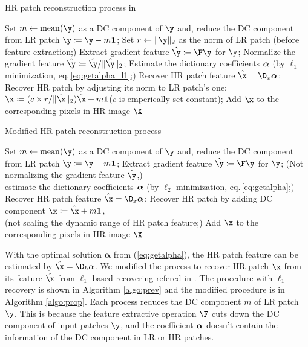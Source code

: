\documentclass[10pt,english]{ikelab-sips}
\begin{document}
 \begin{algorithm}[t]
  \caption{HR patch reconstruction process in \cite{Yang2012}} \label{algo:prev}
  \begin{algorithmic}[1]
   \STATE Set $m\leftarrow\mathrm{mean}(\y)$ as a DC component of $\y$ and,
   \STATE reduce the DC component from LR patch $\y\coloneqq\y-m\bm{1}$;
   \STATE Set $r\leftarrow\|\y\|_2$ as the norm of LR patch (before feature extraction;)
   \STATE Extract gradient feature $\hat\y\coloneqq\F\y$ for $\y$;
   \STATE Normalize the gradient feature $\hat\y\coloneqq\hat\y/\|\hat\y\|_2$;
   \STATE Estimate the dictionary coefficients $\bm{\alpha}$ (by $\ell_1$ minimization, eq.\,\ref{eq:getalpha_l1};)
   \STATE Recover HR patch feature $\hat\x=\D_x\a$;
   \STATE Recover HR patch by adjusting its norm to LR patch's one: \\
   $\x\coloneqq (c \times r / \|\hat\x\|_2) \hat\x + m\bm{1}$\quad ($c$ is emperically set constant);
   \STATE Add $\x$ to the corresponding pixels in HR image $\X$
   \ENDFOR
  \end{algorithmic}
 \end{algorithm}

 \begin{algorithm}[t]
  \caption{Modified HR patch reconstruction process} \label{algo:prop}
  \begin{algorithmic}[1]
   \STATE Set $m\leftarrow \mathrm{mean}(\y)$ as a DC component of $\y$ and,
   \STATE reduce the DC component from LR patch $\y\coloneqq\y-m\bm{1}$;
   \STATE Extract gradient feature $\hat\y\coloneqq\F\y$ for $\y$;
   \STATE (Not normalizing the gradient feature $\hat\y$,) \\
   estimate the dictionary coefficients $\bm{\alpha}$ (by $\ell_2$ minimization, eq.\,\ref{eq:getalpha};)
   \STATE Recover HR patch feature $\hat\x=\D_x\a$;
   \STATE Recover HR patch by adding DC component $\x\coloneqq\hat\x+m\bm{1}$, \\
   (not scaling the dynamic range of HR patch feature;)
   \STATE Add $\x$ to the corresponding pixels in HR image $\X$
   \ENDFOR
  \end{algorithmic}
 \end{algorithm}

 With the optimal solution $\bm{\alpha}$ from (\ref{eq:getalpha}),
 the HR patch feature can be estimated by $\hat\x=\D_h\alpha$.
 We modified the process to recover HR patch $\x$ from its feature $\hat\x$
 from $\ell_1$-based recovering refered in \cite{Yang2012}.
 The procedure with $\ell_1$ recovery is shown in Algorithm \ref{algo:prev} and
 the modified procedure is in Algorithm \ref{algo:prop}.
 Each process reduces the DC component $m$ of LR patch $\y$.
 This is because the feature extractive operation $\F$ cuts down the DC component of
 input patches $\y$, and the coefficient $\bm{\alpha}$ doesn't contain the information of the DC component
 in LR or HR patches.
\end{document}
